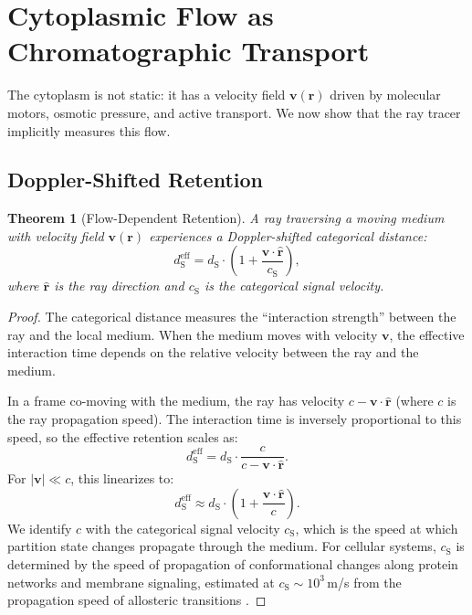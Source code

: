 \documentclass[11pt,twocolumn,a4paper]{article}
\newtheorem{theorem}{Theorem}[section]
\newcommand{\dS}{d_{\mathrm{S}}}
\newcommand{\cS}{c_{\mathrm{S}}}
\begin{document}
\section{Cytoplasmic Flow as Chromatographic Transport}
\label{sec:cytoplasmic-flow}

The cytoplasm is not static: it has a velocity field
$\mathbf{v}(\mathbf{r})$ driven by molecular motors, osmotic
pressure, and active transport. We now show that the ray tracer
implicitly measures this flow.

\subsection{Doppler-Shifted Retention}

\begin{theorem}[Flow-Dependent Retention]
\label{thm:flow-retention}
A ray traversing a moving medium with velocity field
$\mathbf{v}(\mathbf{r})$ experiences a Doppler-shifted categorical
distance:
\begin{equation}
\dS^{\mathrm{eff}} = \dS \cdot \left(1 +
  \frac{\mathbf{v} \cdot \hat{\mathbf{r}}}{\cS}\right),
\label{eq:doppler-retention}
\end{equation}
where $\hat{\mathbf{r}}$ is the ray direction and $\cS$ is the
categorical signal velocity.
\end{theorem}

\begin{proof}
The categorical distance measures the ``interaction strength'' between
the ray and the local medium. When the medium moves with velocity
$\mathbf{v}$, the effective interaction time depends on the relative
velocity between the ray and the medium.

In a frame co-moving with the medium, the ray has velocity
$c - \mathbf{v} \cdot \hat{\mathbf{r}}$ (where $c$ is the ray
propagation speed). The interaction time is inversely proportional to
this speed, so the effective retention scales as:
\begin{equation}
\dS^{\mathrm{eff}} = \dS \cdot \frac{c}{c -
  \mathbf{v} \cdot \hat{\mathbf{r}}}.
\end{equation}
For $|\mathbf{v}| \ll c$, this linearizes to:
\begin{equation}
\dS^{\mathrm{eff}} \approx \dS \cdot \left(1 +
  \frac{\mathbf{v} \cdot \hat{\mathbf{r}}}{c}\right).
\end{equation}
We identify $c$ with the categorical signal velocity $\cS$, which is
the speed at which partition state changes propagate through the
medium. For cellular systems, $\cS$ is determined by the speed of
propagation of conformational changes along protein networks and
membrane signaling, estimated at $\cS \sim 10^3$\,m/s from the
propagation speed of allosteric transitions \citep{groel1997}.
\end{proof}
\end{document}

